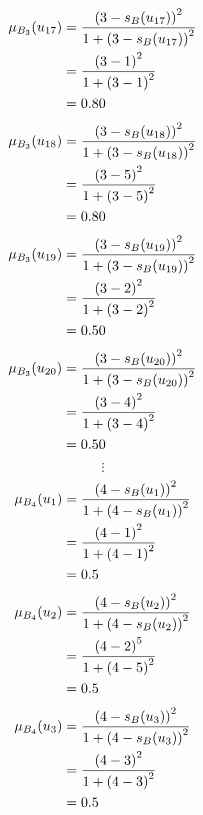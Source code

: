 \documentclass[a4paper,openany]{book}
\begin{document}
				\begin{align}
					\mu_{B_3}(u_{17}) &= \frac{\left(3-s_B(u_{17})\right)^2}{1 + \left(3-s_B(u_{17})\right)^2}\\
					&= \frac{\left(3-1\right)^2}{1 + \left(3-1\right)^2} \notag \\
					&= 0.80 \notag
				\end{align}
				\begin{align}
					\mu_{B_3}(u_{18}) &= \frac{\left(3-s_B(u_{18})\right)^2}{1 + \left(3-s_B(u_{18})\right)^2}\\
					&= \frac{\left(3-5\right)^2}{1 + \left(3-5\right)^2} \notag \\
					&= 0.80 \notag
				\end{align}
				\begin{align}
					\mu_{B_3}(u_{19}) &= \frac{\left(3-s_B(u_{19})\right)^2}{1 + \left(3-s_B(u_{19})\right)^2}\\
					&= \frac{\left(3-2\right)^2}{1 + \left(3-2\right)^2} \notag \\
					&= 0.50 \notag
				\end{align}
				\begin{align}
					\mu_{B_3}(u_{20}) &= \frac{\left(3-s_B(u_{20})\right)^2}{1 + \left(3-s_B(u_{20})\right)^2}\\
					&= \frac{\left(3-4\right)^2}{1 + \left(3-4\right)^2} \notag \\
					&= 0.50 \notag
				\end{align}
				\[
					\vdots
				\]
				\begin{align}
					\mu_{B_4}(u_1) &= \frac{\left(4-s_B(u_1)\right)^2}{1 + \left(4-s_B(u_1)\right)^2}\\
					&= \frac{\left(4-1\right)^2}{1 + \left(4-1\right)^2} \notag \\
					&= 0.5 \notag
				\end{align}
				\begin{align}
					\mu_{B_4}(u_2) &= \frac{\left(4-s_B(u_2)\right)^2}{1 + \left(4-s_B(u_2)\right)^2}\\
					&= \frac{\left(4-2\right)^5}{1 + \left(4-5\right)^2} \notag \\
					&= 0.5 \notag
				\end{align}
				\begin{align}
					\mu_{B_4}(u_3) &= \frac{\left(4-s_B(u_3)\right)^2}{1 + \left(4-s_B(u_3)\right)^2}\\
					&= \frac{\left(4-3\right)^2}{1 + \left(4-3\right)^2} \notag \\
					&= 0.5 \notag
				\end{align}
\end{document}
